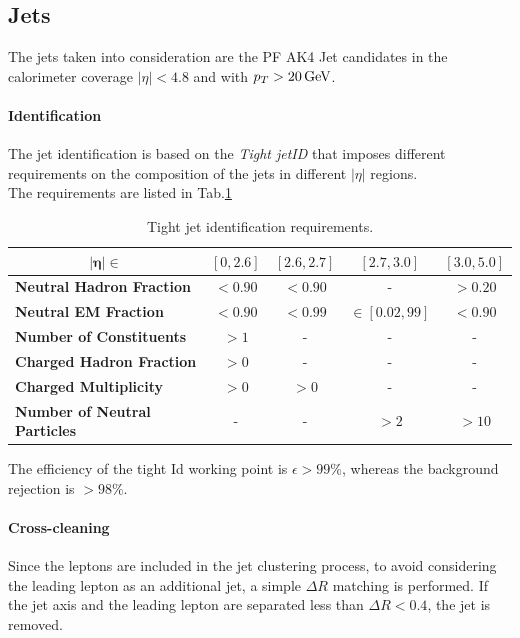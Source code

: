 \subsection{Jets}\label{sec:jet}
The jets taken into consideration are the PF AK4 Jet candidates in the calorimeter coverage $|\eta|<4.8$ and with $p_T>20{\,\text{Ge\hspace{-.08em}V}}$.


\paragraph*{Identification}
The jet identification is based on the \emph{Tight jetID} that imposes different requirements on the composition of the jets in different $|\eta|$ regions.\\
The requirements are listed in Tab.\ref{tab:jet_id}

\begin{table}[H]
    \centering
    \fontsize{11pt}{11pt}\selectfont
    \begin{tabular}{l|c|c|c|c}
        \toprule
         \multicolumn{1}{c|}{$\bm{|\eta|\in}$}&  $[0,2.6]$& $[2.6,2.7]$ & $[2.7,3.0]$ & $[3.0,5.0]$\\
         \midrule
         \textbf{Neutral Hadron Fraction} & $<0.90$ &  $<0.90$ & - & $>0.20$\\
         \midrule
         \textbf{Neutral EM Fraction} & $<0.90$ & $<0.99$ & $\in[0.02,99]$ & $<0.90$\\
         \midrule
         \textbf{Number of Constituents } & $>1$ & - & - &  -\\
         \midrule
         \textbf{Charged Hadron Fraction} & $>0$ & - & - & -\\
         \midrule
         \textbf{Charged Multiplicity} & $>0$ & $>0$ & - & -\\
         \midrule
         \textbf{Number of Neutral Particles}& - & - & $>2$ & $>10$\\
         \bottomrule
    \end{tabular}
    \caption{Tight jet identification requirements.}
    \label{tab:jet_id}
\end{table}
The efficiency of the tight Id working point is $\epsilon>99\%$, whereas the background rejection is $>98\%$. 
\paragraph*{Cross-cleaning} 
Since the leptons are included in the jet clustering process, to avoid considering the leading lepton as an additional jet, a simple $\Delta R$ matching is performed. If the jet axis and the leading lepton are separated less than $\Delta R<0.4$, the jet is removed. 

